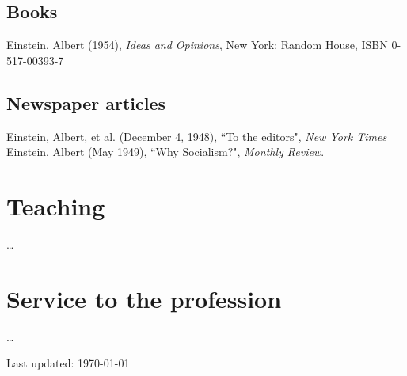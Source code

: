 \documentclass[11pt]{article} %
\begin{document}

\subsection*{Books}

Einstein, Albert (1954), \emph{Ideas and Opinions}, New York: Random House, ISBN 0-517-00393-7


\subsection*{Newspaper articles}

Einstein, Albert, et al. (December 4, 1948), “To the editors", \emph{New York Times}\\
Einstein, Albert (May 1949), “Why Socialism?", \emph{Monthly Review}.


\section*{Teaching}

\ldots


\section*{Service to the profession}

\ldots

\vfill %


\fi
\begin{center}
	\scriptsize
	Last updated: \today
\end{center}

\end{document}

